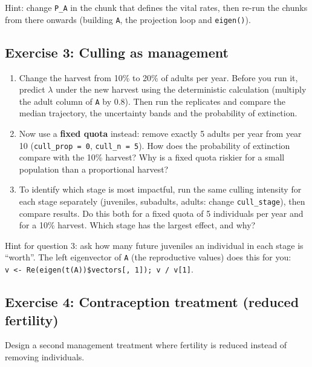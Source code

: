 \documentclass[
  a4paper]{book}
\providecommand{\tightlist}{%
  \setlength{\itemsep}{0pt}\setlength{\parskip}{0pt}}
\begin{document}
Hint: change \texttt{P\_A} in the chunk that defines the vital rates, then re-run the chunks from there onwards (building \texttt{A}, the projection loop and \texttt{eigen()}).

\subsection{Exercise 3: Culling as management}\label{exercise-3-culling-as-management}

\begin{enumerate}
\def\labelenumi{\arabic{enumi}.}
\tightlist
\item
  Change the harvest from 10\% to 20\% of adults per year. Before you run it, predict \(\lambda\) under the new harvest using the deterministic calculation (multiply the adult column of \texttt{A} by 0.8). Then run the replicates and compare the median trajectory, the uncertainty bands and the probability of extinction.
\item
  Now use a \textbf{fixed quota} instead: remove exactly 5 adults per year from year 10 (\texttt{cull\_prop\ =\ 0}, \texttt{cull\_n\ =\ 5}). How does the probability of extinction compare with the 10\% harvest? Why is a fixed quota riskier for a small population than a proportional harvest?
\item
  To identify which stage is most impactful, run the same culling intensity for each stage separately (juveniles, subadults, adults: change \texttt{cull\_stage}), then compare results. Do this both for a fixed quota of 5 individuals per year and for a 10\% harvest. Which stage has the largest effect, and why?
\end{enumerate}

Hint for question 3: ask how many future juveniles an individual in each stage is ``worth''. The left eigenvector of \texttt{A} (the reproductive values) does this for you: \texttt{v\ \textless{}-\ Re(eigen(t(A))\$vectors{[},\ 1{]});\ v\ /\ v{[}1{]}}.

\subsection{Exercise 4: Contraception treatment (reduced fertility)}\label{exercise-4-contraception-treatment-reduced-fertility}

Design a second management treatment where fertility is reduced instead of removing individuals.
\end{document}
